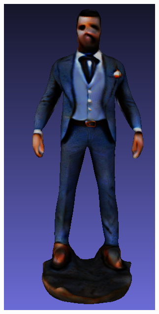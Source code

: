 \begin{figure}[ht]
\begin{subfigure}[b]{0.15\textwidth}
        \includegraphics[width=\textwidth]{etc/bias/bias_rich_genie_2.png}
        \caption{}
    \end{subfigure}
    \begin{subfigure}[b]{0.16\textwidth}

\end{subfigure}
\end{figure}
